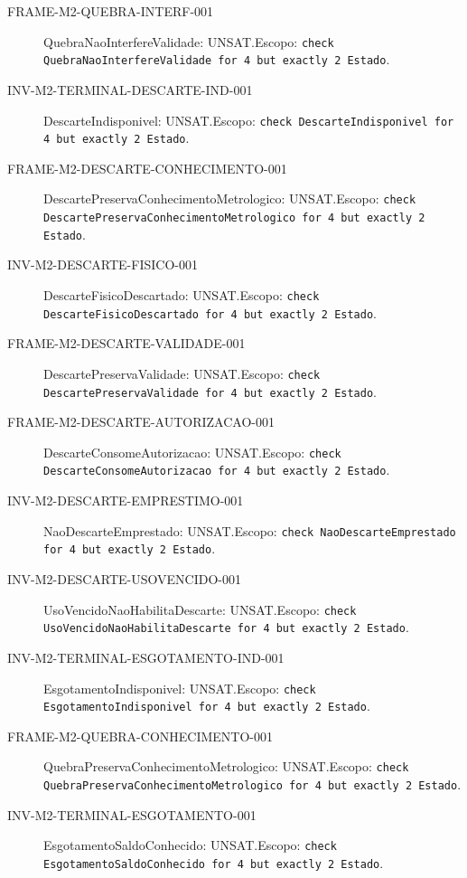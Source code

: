 \begin{description}
\item[FRAME-M2-QUEBRA-INTERF-001] QuebraNaoInterfereValidade: UNSAT.\newline Escopo: \texttt{check QuebraNaoInterfereValidade for 4 but exactly 2 Estado}.
\item[INV-M2-TERMINAL-DESCARTE-IND-001] DescarteIndisponivel: UNSAT.\newline Escopo: \texttt{check DescarteIndisponivel for 4 but exactly 2 Estado}.
\item[FRAME-M2-DESCARTE-CONHECIMENTO-001] DescartePreservaConhecimentoMetrologico: UNSAT.\newline Escopo: \texttt{check DescartePreservaConhecimentoMetrologico for 4 but exactly 2 Estado}.
\item[INV-M2-DESCARTE-FISICO-001] DescarteFisicoDescartado: UNSAT.\newline Escopo: \texttt{check DescarteFisicoDescartado for 4 but exactly 2 Estado}.
\item[FRAME-M2-DESCARTE-VALIDADE-001] DescartePreservaValidade: UNSAT.\newline Escopo: \texttt{check DescartePreservaValidade for 4 but exactly 2 Estado}.
\item[FRAME-M2-DESCARTE-AUTORIZACAO-001] DescarteConsomeAutorizacao: UNSAT.\newline Escopo: \texttt{check DescarteConsomeAutorizacao for 4 but exactly 2 Estado}.
\item[INV-M2-DESCARTE-EMPRESTIMO-001] NaoDescarteEmprestado: UNSAT.\newline Escopo: \texttt{check NaoDescarteEmprestado for 4 but exactly 2 Estado}.
\item[INV-M2-DESCARTE-USOVENCIDO-001] UsoVencidoNaoHabilitaDescarte: UNSAT.\newline Escopo: \texttt{check UsoVencidoNaoHabilitaDescarte for 4 but exactly 2 Estado}.
\item[INV-M2-TERMINAL-ESGOTAMENTO-IND-001] EsgotamentoIndisponivel: UNSAT.\newline Escopo: \texttt{check EsgotamentoIndisponivel for 4 but exactly 2 Estado}.
\item[FRAME-M2-QUEBRA-CONHECIMENTO-001] QuebraPreservaConhecimentoMetrologico: UNSAT.\newline Escopo: \texttt{check QuebraPreservaConhecimentoMetrologico for 4 but exactly 2 Estado}.
\item[INV-M2-TERMINAL-ESGOTAMENTO-001] EsgotamentoSaldoConhecido: UNSAT.\newline Escopo: \texttt{check EsgotamentoSaldoConhecido for 4 but exactly 2 Estado}.

\end{description}
